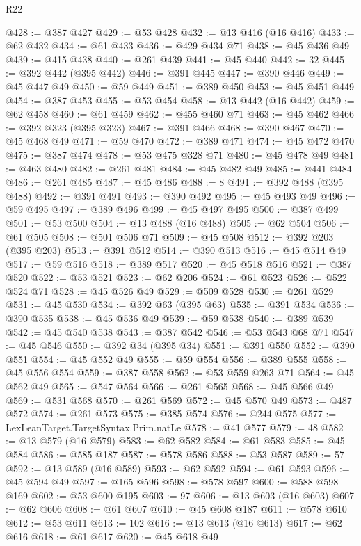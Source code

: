 \begin{lexlean}{R22}
\begin{coremodule}
@428 := @387 @427
@429 := @53 @428
@432 := @13 @416 (@16 @416)
@433 := @62 @432
@434 := @61 @433
@436 := @429 @434 @71
@438 := @45 @436 @49
@439 := @415 @438
@440 := @261 @439
@441 := @45 @440
@442 := 32
@445 := @392 @442 (@395 @442)
@446 := @391 @445
@447 := @390 @446
@449 := @45 @447 @49
@450 := @59 @449
@451 := @389 @450
@453 := @45 @451 @449
@454 := @387 @453
@455 := @53 @454
@458 := @13 @442 (@16 @442)
@459 := @62 @458
@460 := @61 @459
@462 := @455 @460 @71
@463 := @45 @462
@466 := @392 @323 (@395 @323)
@467 := @391 @466
@468 := @390 @467
@470 := @45 @468 @49
@471 := @59 @470
@472 := @389 @471
@474 := @45 @472 @470
@475 := @387 @474
@478 := @53 @475 @328 @71
@480 := @45 @478 @49
@481 := @463 @480
@482 := @261 @481
@484 := @45 @482 @49
@485 := @441 @484
@486 := @261 @485
@487 := @45 @486
@488 := 8
@491 := @392 @488 (@395 @488)
@492 := @391 @491
@493 := @390 @492
@495 := @45 @493 @49
@496 := @59 @495
@497 := @389 @496
@499 := @45 @497 @495
@500 := @387 @499
@501 := @53 @500
@504 := @13 @488 (@16 @488)
@505 := @62 @504
@506 := @61 @505
@508 := @501 @506 @71
@509 := @45 @508
@512 := @392 @203 (@395 @203)
@513 := @391 @512
@514 := @390 @513
@516 := @45 @514 @49
@517 := @59 @516
@518 := @389 @517
@520 := @45 @518 @516
@521 := @387 @520
@522 := @53 @521
@523 := @62 @206
@524 := @61 @523
@526 := @522 @524 @71
@528 := @45 @526 @49
@529 := @509 @528
@530 := @261 @529
@531 := @45 @530
@534 := @392 @63 (@395 @63)
@535 := @391 @534
@536 := @390 @535
@538 := @45 @536 @49
@539 := @59 @538
@540 := @389 @539
@542 := @45 @540 @538
@543 := @387 @542
@546 := @53 @543 @68 @71
@547 := @45 @546
@550 := @392 @34 (@395 @34)
@551 := @391 @550
@552 := @390 @551
@554 := @45 @552 @49
@555 := @59 @554
@556 := @389 @555
@558 := @45 @556 @554
@559 := @387 @558
@562 := @53 @559 @263 @71
@564 := @45 @562 @49
@565 := @547 @564
@566 := @261 @565
@568 := @45 @566 @49
@569 := @531 @568
@570 := @261 @569
@572 := @45 @570 @49
@573 := @487 @572
@574 := @261 @573
@575 := @385 @574
@576 := @244 @575
@577 := LexLeanTarget.TargetSyntax.Prim.natLe
@578 := @41 @577
@579 := 48
@582 := @13 @579 (@16 @579)
@583 := @62 @582
@584 := @61 @583
@585 := @45 @584
@586 := @585 @187
@587 := @578 @586
@588 := @53 @587
@589 := 57
@592 := @13 @589 (@16 @589)
@593 := @62 @592
@594 := @61 @593
@596 := @45 @594 @49
@597 := @165 @596
@598 := @578 @597
@600 := @588 @598 @169
@602 := @53 @600 @195
@603 := 97
@606 := @13 @603 (@16 @603)
@607 := @62 @606
@608 := @61 @607
@610 := @45 @608 @187
@611 := @578 @610
@612 := @53 @611
@613 := 102
@616 := @13 @613 (@16 @613)
@617 := @62 @616
@618 := @61 @617
@620 := @45 @618 @49

\end{coremodule}
\end{lexlean}
